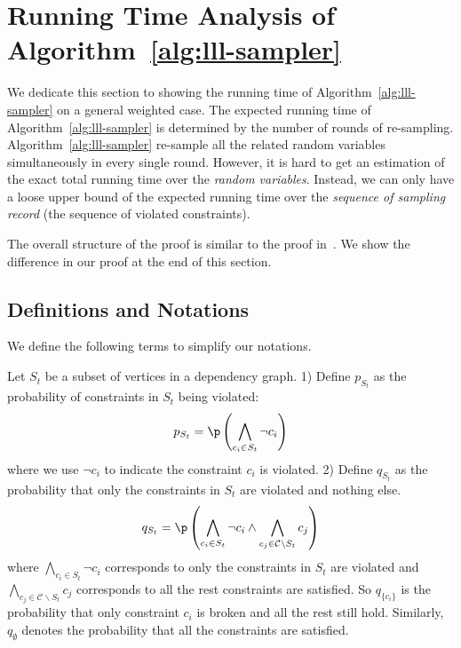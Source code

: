 
\section{Running Time Analysis of Algorithm~\ref{alg:lll-sampler}} \label{appendix:time-analysis}
We dedicate this section to showing the running time of Algorithm~\ref{alg:lll-sampler} on a general weighted case.
%
The expected running time of Algorithm~\ref{alg:lll-sampler} is determined by the number of rounds of re-sampling.  
%
Algorithm~\ref{alg:lll-sampler} re-sample all the related random variables simultaneously in every single round.
%
However, it is hard to get an estimation of the exact total running time over the \textit{random variables}. Instead, we can only have a loose upper bound of the expected running time over the \textit{sequence of sampling record} (the sequence of violated constraints).


The overall structure of the proof is similar to the proof in~\citet[Theorem 13]{DBLP:journals/jacm/GuoJL19}. We show the difference in our proof at the end of this section.

\subsection{Definitions and Notations}
We define the following terms to simplify our notations.
\begin{definition}  \label{def:p_q_st}
Let $S_t$ be a subset of vertices in a dependency graph.
1) Define $p_{S_t}$ as the probability of  constraints in $S_t$ being violated:
\begin{equation} \label{eq:def-pst}
p_{S_t}=\p\left(\bigwedge_{c_i \in S_t}\neg{c}_i \right)
\end{equation}
{where we use $\neg{c}_i $ to indicate the constraint $c_i$ is violated.}
2) Define $q_{S_t}$ as the probability that only the constraints in $S_t$ are violated and nothing else. 
\begin{equation} \label{eq:definition-qst}
q_{S_t}=\p\left(\bigwedge_{c_i \in S_t}\neg{c}_i \wedge \bigwedge_{c_j \in \mathcal{C}\backslash S_t}c_j\right)
\end{equation}
{where $\bigwedge_{c_i \in S_t}\neg{c}_i $ corresponds to only the constraints in $S_t$ are violated and $\bigwedge_{c_j \in \mathcal{C}\backslash S_t}c_j$ corresponds to all the rest constraints are satisfied.}
So $q_{\{c_i\}}$ is the probability that only constraint $c_i$ is broken and all the rest still  hold. Similarly, $q_{\emptyset}$ denotes the probability that all the constraints are satisfied.
\end{definition}



